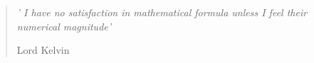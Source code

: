 \clearpage
\vspace*{\fill}
\thispagestyle{empty} %
\begin{quotation}
	\em %
	'	I have no satisfaction in mathematical formula unless I feel their numerical magnitude'
	
	\medskip
	\raggedleft
	Lord Kelvin
\end{quotation}
\vspace*{\fill}
\clearpage